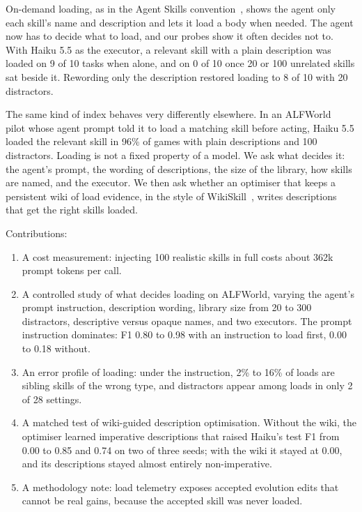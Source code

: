 \documentclass[11pt]{article}
\begin{document}
On-demand loading, as in the Agent Skills convention~\cite{anthropic2025overview,anthropic2025engineering}, shows the agent only each skill's name and description and lets it load a body when needed. The agent now has to decide what to load, and our probes show it often decides not to. With Haiku 5.5 as the executor, a relevant skill with a plain description was loaded on 9 of 10 tasks when alone, and on 0 of 10 once 20 or 100 unrelated skills sat beside it. Rewording only the description restored loading to 8 of 10 with 20 distractors.

The same kind of index behaves very differently elsewhere. In an ALFWorld~\cite{shridhar2021alfworld} pilot whose agent prompt told it to load a matching skill before acting, Haiku 5.5 loaded the relevant skill in 96\% of games with plain descriptions and 100 distractors. Loading is not a fixed property of a model. We ask what decides it: the agent's prompt, the wording of descriptions, the size of the library, how skills are named, and the executor. We then ask whether an optimiser that keeps a persistent wiki of load evidence, in the style of WikiSkill~\cite{tang2026wikiskill}, writes descriptions that get the right skills loaded.

Contributions:
\begin{enumerate}
\item A cost measurement: injecting 100 realistic skills in full costs about 362k prompt tokens per call.
\item A controlled study of what decides loading on ALFWorld, varying the agent's prompt instruction, description wording, library size from 20 to 300 distractors, descriptive versus opaque names, and two executors. The prompt instruction dominates: F1 0.80 to 0.98 with an instruction to load first, 0.00 to 0.18 without.
\item An error profile of loading: under the instruction, 2\% to 16\% of loads are sibling skills of the wrong type, and distractors appear among loads in only 2 of 28 settings.
\item A matched test of wiki-guided description optimisation. Without the wiki, the optimiser learned imperative descriptions that raised Haiku's test F1 from 0.00 to 0.85 and 0.74 on two of three seeds; with the wiki it stayed at 0.00, and its descriptions stayed almost entirely non-imperative.
\item A methodology note: load telemetry exposes accepted evolution edits that cannot be real gains, because the accepted skill was never loaded.
\end{enumerate}
\end{document}
